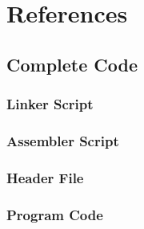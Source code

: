 \section{References}
\label{sec:References}

\subsection{Complete Code}
\label{subsec:CompCode}

\subsubsection{Linker Script}
\label{subsec:Linker}



\subsubsection{Assembler Script}
\label{subsec:Assembler}



\subsubsection{Header File}
\label{subsec:Header}



\subsubsection{Program Code}
\label{sec:ProgCode}


